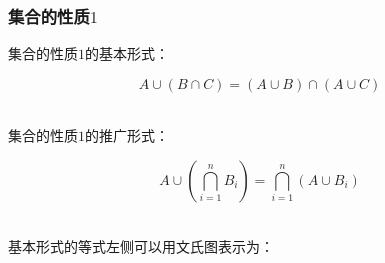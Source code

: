 \documentclass[UTF8]{ctexart}
\begin{document}
\newpage

\subsubsection{集合的性质$1$}
    集合的性质$1$的基本形式：
    \begin{large}
        \begin{equation*}
            A\cup(B\cap C)=(A\cup B)\cap(A\cup C)
        \end{equation*}
    \end{large}\\
    集合的性质$1$的推广形式：
    \begin{large}
        \begin{equation*}
            A\cup\left(\bigcap_{i=1}^n B_i\right)=\bigcap_{i=1}^n(A\cup B_i)
        \end{equation*}
    \end{large}\\[5mm]
    基本形式的等式左侧可以用文氏图表示为：\vspace{5pt}
\end{document}
